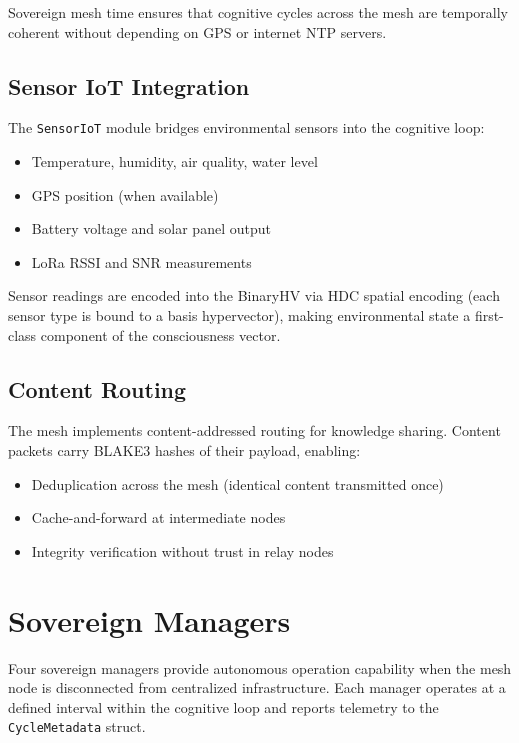 \documentclass[11pt,twocolumn]{article}
\begin{document}
Sovereign mesh time ensures that cognitive cycles across the mesh are
temporally coherent without depending on GPS or internet NTP servers.

\subsection{Sensor IoT Integration}

The \texttt{SensorIoT} module bridges environmental sensors into the
cognitive loop:

\begin{itemize}[nosep]
  \item Temperature, humidity, air quality, water level
  \item GPS position (when available)
  \item Battery voltage and solar panel output
  \item LoRa RSSI and SNR measurements
\end{itemize}

Sensor readings are encoded into the BinaryHV via HDC spatial encoding
(each sensor type is bound to a basis hypervector), making environmental
state a first-class component of the consciousness vector.

\subsection{Content Routing}

The mesh implements content-addressed routing for knowledge sharing.
Content packets carry BLAKE3 hashes of their payload, enabling:
\begin{itemize}[nosep]
  \item Deduplication across the mesh (identical content transmitted once)
  \item Cache-and-forward at intermediate nodes
  \item Integrity verification without trust in relay nodes
\end{itemize}

\section{Sovereign Managers}

Four sovereign managers provide autonomous operation capability when
the mesh node is disconnected from centralized infrastructure. Each
manager operates at a defined interval within the cognitive loop and
reports telemetry to the \texttt{CycleMetadata} struct.
\end{document}
